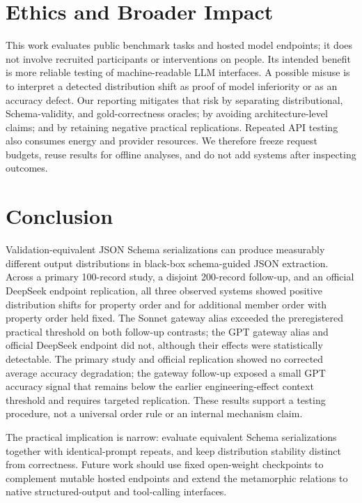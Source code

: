 \documentclass[10pt]{article}
\begin{document}
\section{Ethics and Broader Impact}
This work evaluates public benchmark tasks and hosted model endpoints; it does not involve recruited participants or interventions on people. Its intended benefit is more reliable testing of machine-readable LLM interfaces. A possible misuse is to interpret a detected distribution shift as proof of model inferiority or as an accuracy defect. Our reporting mitigates that risk by separating distributional, Schema-validity, and gold-correctness oracles; by avoiding architecture-level claims; and by retaining negative practical replications. Repeated API testing also consumes energy and provider resources. We therefore freeze request budgets, reuse results for offline analyses, and do not add systems after inspecting outcomes.

\section{Conclusion}
Validation-equivalent JSON Schema serializations can produce measurably different output distributions in black-box schema-guided JSON extraction. Across a primary 100-record study, a disjoint 200-record follow-up, and an official DeepSeek endpoint replication, all three observed systems showed positive distribution shifts for property order and for additional member order with property order held fixed. The Sonnet gateway alias exceeded the preregistered practical threshold on both follow-up contrasts; the GPT gateway alias and official DeepSeek endpoint did not, although their effects were statistically detectable. The primary study and official replication showed no corrected average accuracy degradation; the gateway follow-up exposed a small GPT accuracy signal that remains below the earlier engineering-effect context threshold and requires targeted replication. These results support a testing procedure, not a universal order rule or an internal mechanism claim.

The practical implication is narrow: evaluate equivalent Schema serializations together with identical-prompt repeats, and keep distribution stability distinct from correctness. Future work should use fixed open-weight checkpoints to complement mutable hosted endpoints and extend the metamorphic relations to native structured-output and tool-calling interfaces.



\end{document}
